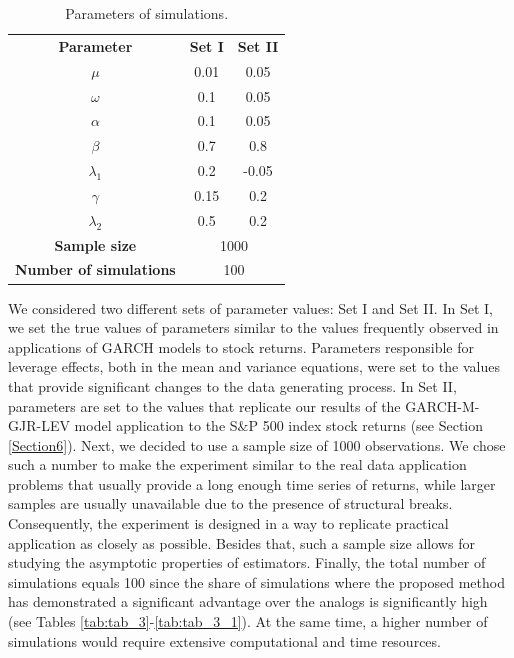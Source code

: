 \documentclass[authoryear, 1p]{elsarticle}
\numberwithin{equation}{section}
\begin{document}
\begin{table}[h!]
\centering
\caption{Parameters of simulations.}
\label{tab:tab_1}
\begin{tabular}{ccc}
\hline
\hline
\textbf{Parameter} & \textbf{Set I}          & \textbf{Set II}  \\
$\mu$         & 0.01           & 0.05          \\
$\omega$      & 0.1            & 0.05          \\
$\alpha$      & 0.1            & 0.05          \\
$\beta$       & 0.7            & 0.8           \\
$\lambda_{1}$ & 0.2            & -0.05         \\
$\gamma$      & 0.15           & 0.2           \\
$\lambda_{2}$ & 0.5            & 0.2           \\
\hline
\textbf{Sample size}  & \multicolumn{2}{c}{1000}         \\
\textbf{Number of simulations} & \multicolumn{2}{c}{100}  \\
\hline
\hline
\end{tabular}
\end{table}

We considered two different sets of parameter values: Set I and Set II. In Set I, we set the true values of parameters similar to the values frequently observed in applications of GARCH models to stock returns. Parameters responsible for leverage effects, both in the mean and variance equations, were set to the values that provide significant changes to the data generating process. In Set II, parameters are set to the values that replicate our results of the GARCH-M-GJR-LEV model application to the S\&P 500 index stock returns (see Section \ref{Section6}). 
Next, we decided to use a sample size of 1000 observations. We chose such a number to make the experiment similar to the real data application problems that usually provide a long enough time series of returns, while larger samples are usually unavailable due to the presence of structural breaks. Consequently, the experiment is designed in a way to replicate practical application as closely as possible. Besides that, such a sample size allows for studying the asymptotic properties of estimators. Finally, the total number of simulations equals 100 since the share of simulations where the proposed method has demonstrated a significant advantage over the analogs is significantly high (see Tables \ref{tab:tab_3}-\ref{tab:tab_3_1}). At the same time, a higher number of simulations would require extensive computational and time resources.
\end{document}
